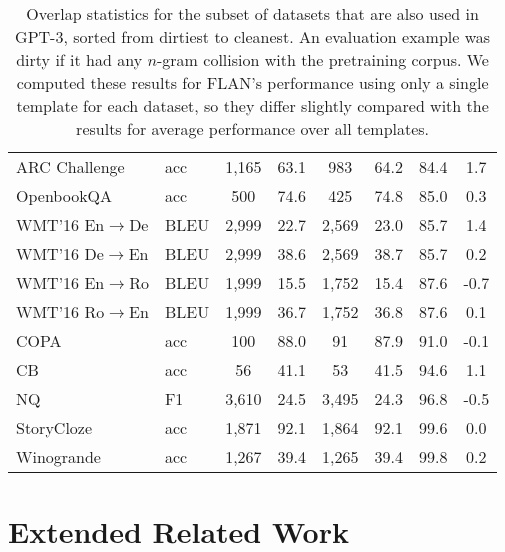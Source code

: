 \begin{table}[h]
\begin{tabular}{ll cc cc cc}
        ARC Challenge         & acc & 1,165  & 63.1 & 983  & 64.2 & 84.4 & 1.7   \\
        OpenbookQA             & acc & 500   & 74.6 & 425  & 74.8 & 85.0 & 0.3   \\
        WMT'16 En$\rightarrow$De & BLEU     & 2,999  & 22.7 & 2,569 & 23.0 & 85.7 & 1.4   \\
        WMT'16 De$\rightarrow$En & BLEU     & 2,999  & 38.6 & 2,569 & 38.7 & 85.7 & 0.2   \\
        WMT'16 En$\rightarrow$Ro & BLEU     & 1,999  & 15.5 & 1,752 & 15.4 & 87.6 & -0.7  \\
        WMT'16 Ro$\rightarrow$En & BLEU     & 1,999  & 36.7 & 1,752 & 36.8 & 87.6 & 0.1   \\
        COPA                   & acc & 100   & 88.0 & 91   & 87.9 & 91.0 & -0.1  \\
        CB                     & acc & 56    & 41.1 & 53   & 41.5 & 94.6 & 1.1   \\
        NQ     & F1       & 3,610  & 24.5 & 3,495 & 24.3 & 96.8 & -0.5  \\
        StoryCloze           & acc & 1,871  & 92.1 & 1,864 & 92.1 & 99.6 & 0.0   \\
        Winogrande             & acc & 1,267  & 39.4 & 1,265 & 39.4 & 99.8 & 0.2   \\
        \bottomrule
        \end{tabular}
    \caption{
    Overlap statistics for the subset of datasets that are also used in GPT-3, sorted from dirtiest to cleanest. 
    An evaluation example was dirty if it had any $n$-gram collision with the pretraining corpus. 
    We computed these results for FLAN's performance using only a single template for each dataset, so they differ slightly compared with the results for average performance over all templates.
    }
    \label{tab:data_contamination}
    \end{table}
\endgroup
\clearpage 
\section{Extended Related Work}\label{sec:extended_related_work}

